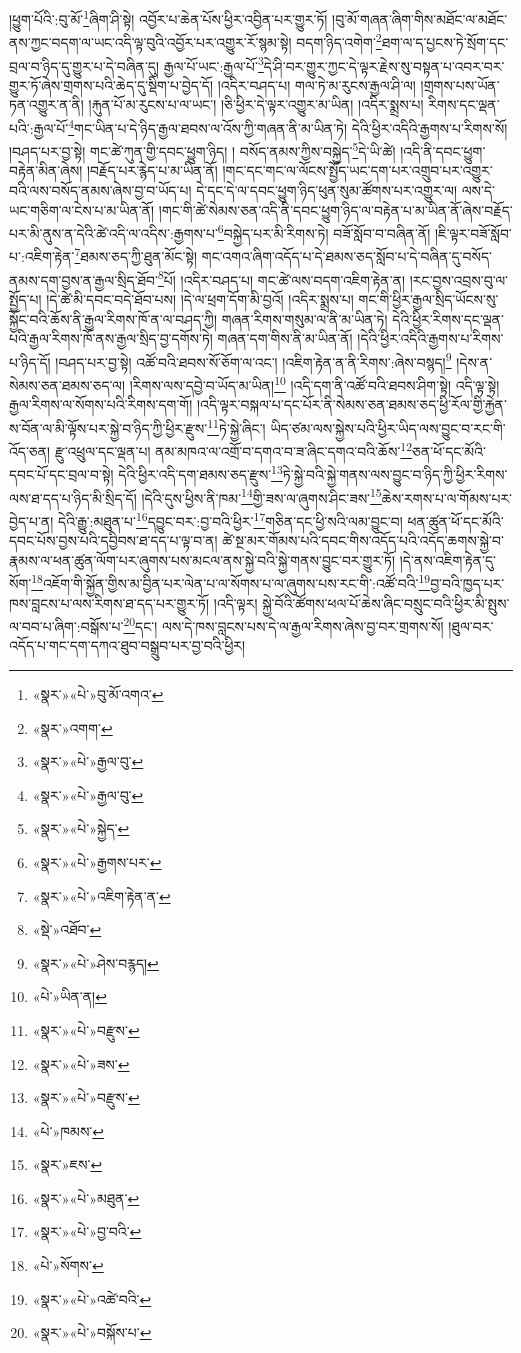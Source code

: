 །ཕྱུག་པོའི་:བུ་མོ་\footnote{«སྣར་»«པེ་»བུ་མོ་འགའ་}ཞིག་ཤི་སྟེ། འབྱོར་པ་ཆེན་པོས་ཕྱིར་འབྱིན་པར་གྱུར་ཏོ། །བུ་མོ་གཞན་ཞིག་གིས་མཐོང་ལ་མཐོང་ནས་ཀྱང་བདག་ལ་ཡང་འདི་ལྟ་བུའི་འབྱོར་པར་འགྱུར་རོ་སྙམ་སྟེ། བདག་ཉིད་འགེག་\footnote{«སྣར་»འགག་}ཐག་ལ་ད་པྱངས་ཏེ་སྲོག་དང་བྲལ་བ་ཉིད་དུ་གྱུར་པ་དེ་བཞིན་དུ། རྒྱལ་པོ་ཡང་:རྒྱལ་པོ་\footnote{«སྣར་»«པེ་»རྒྱལ་བུ་}དེ་ཤི་བར་གྱུར་ཀྱང་དེ་ལྟར་རྗེས་སུ་བསྟན་པ་འབར་བར་གྱུར་ཏོ་ཞེས་གྲགས་པའི་ཆེད་དུ་སྡིག་པ་བྱེད་དོ། །འདིར་བཤད་པ། གལ་ཏེ་མ་རུངས་རྒྱལ་ཤི་ལ། །གྲགས་པས་ཡོན་ཏན་འགྱུར་ན་ནི། །རྐུན་པོ་མ་རུངས་པ་ལ་ཡང་། །ཅི་ཕྱིར་དེ་ལྟར་འགྱུར་མ་ཡིན། །འདིར་སྨྲས་པ། རིགས་དང་ལྡན་པའི་:རྒྱལ་པོ་\footnote{«སྣར་»«པེ་»རྒྱལ་བུ་}གང་ཡིན་པ་དེ་ཉིད་རྒྱལ་ཐབས་ལ་འོས་ཀྱི་གཞན་ནི་མ་ཡིན་ཏེ། དེའི་ཕྱིར་འདིའི་རྒྱགས་པ་རིགས་སོ། །བཤད་པར་བྱ་སྟེ། གང་ཚེ་ཀུན་གྱི་དབང་ཕྱུག་ཉིད། །
བསོད་ནམས་ཀྱིས་བསྐྱེད་\footnote{«སྣར་»«པེ་»སྐྱེད་}དེ་ཡི་ཚེ། །འདི་ནི་དབང་ཕྱུག་བརྟེན་མིན་ཞེས། །བརྗོད་པར་རྙེད་པ་མ་ཡིན་ནོ། །གང་དང་གང་ལ་ལོངས་སྤྱོད་ཡང་དག་པར་འགྲུབ་པར་འགྱུར་བའི་ལས་བསོད་ནམས་ཞེས་བྱ་བ་ཡོད་པ། དེ་དང་དེ་ལ་དབང་ཕྱུག་ཉིད་ཕུན་སུམ་ཚོགས་པར་འགྱུར་ལ། ལས་དེ་ཡང་གཅིག་ལ་ངེས་པ་མ་ཡིན་ནོ། །གང་གི་ཚེ་སེམས་ཅན་འདི་ནི་དབང་ཕྱུག་ཉིད་ལ་བརྟེན་པ་མ་ཡིན་ནོ་ཞེས་བརྗོད་པར་མི་ནུས་ན་དེའི་ཚེ་འདི་ལ་འདིས་:རྒྱགས་པ་\footnote{«སྣར་»«པེ་»རྒྱགས་པར་}བསྐྱེད་པར་མི་རིགས་ཏེ། བཟོ་སློབ་བ་བཞིན་ནོ། །ཇི་ལྟར་བཟོ་སློབ་པ་:འཇིག་རྟེན་\footnote{«སྣར་»«པེ་»འཇིག་རྟེན་ན་}ཐམས་ཅད་ཀྱི་ཐུན་མོང་སྟེ། གང་འགའ་ཞིག་འདོད་པ་དེ་ཐམས་ཅད་སློབ་པ་དེ་བཞིན་དུ་བསོད་ནམས་དག་བྱས་ན་རྒྱལ་སྲིད་ཐོབ་\footnote{«སྡེ་»འཐོབ་}པོ། །འདིར་བཤད་པ། གང་ཚེ་ལས་བདག་འཇིག་རྟེན་ན། །རང་བྱས་འབྲས་བུ་ལ་སྤྱོད་པ། །དེ་ཚེ་མི་དབང་བདེ་ཐོབ་པས། །དེ་ལ་ཕྲག་དོག་མི་བྱའོ། །འདིར་སྨྲས་པ། གང་གི་ཕྱིར་རྒྱལ་སྲིད་ཡོངས་སུ་སྐྱོང་བའི་ཆོས་ནི་རྒྱལ་རིགས་ཁོ་ན་ལ་བཤད་ཀྱི། གཞན་རིགས་གསུམ་ལ་ནི་མ་ཡིན་ཏེ། དེའི་ཕྱིར་རིགས་དང་ལྡན་པའི་རྒྱལ་རིགས་ཁོ་ནས་རྒྱལ་སྲིད་བྱ་དགོས་ཏེ། གཞན་དག་གིས་ནི་མ་ཡིན་ནོ། །དེའི་ཕྱིར་འདིའི་རྒྱགས་པ་རིགས་པ་ཉིད་དོ། །བཤད་པར་བྱ་སྟེ། འཚོ་བའི་ཐབས་སོ་ཅོག་ལ་འང་། །འཇིག་རྟེན་ན་ནི་རིགས་:ཞེས་བསྙད།\footnote{«སྣར་»«པེ་»ཤེས་བརྙད།} །དེས་ན་སེམས་ཅན་ཐམས་ཅད་ལ། །རིགས་ལས་དབྱེ་བ་ཡོད་མ་ཡིན།\footnote{«པེ་»ཡིན་ན།} །འདི་དག་ནི་འཚོ་བའི་ཐབས་ཤིག་སྟེ། འདི་ལྟ་སྟེ། རྒྱལ་རིགས་ལ་སོགས་པའི་རིགས་དག་གོ། །འདི་ལྟར་བསྐལ་པ་དང་པོར་ནི་སེམས་ཅན་ཐམས་ཅད་ཕྱི་རོལ་གྱི་རྐྱེན་ས་བོན་ལ་མི་ལྟོས་པར་སྐྱེ་བ་ཉིད་ཀྱི་ཕྱིར་རྫུས་\footnote{«སྣར་»«པེ་»བརྫུས་}ཏེ་སྐྱེ་ཞིང་། ཡིད་ཙམ་ལས་སྐྱེས་པའི་ཕྱིར་ཡིད་ལས་བྱུང་བ་རང་གི་འོད་ཅན། རྫུ་འཕྲུལ་དང་ལྡན་པ། ནམ་མཁའ་ལ་འགྲོ་བ་དགའ་བ་ཟ་ཞིང་དགའ་བའི་ཆོས་\footnote{«སྣར་»«པེ་»ཟས་}ཅན་ཕོ་དང་མོའི་དབང་པོ་དང་བྲལ་བ་སྟེ། དེའི་ཕྱིར་འདི་དག་ཐམས་ཅད་རྫུས་\footnote{«སྣར་»«པེ་»བརྫུས་}ཏེ་སྐྱེ་བའི་སྐྱེ་གནས་ལས་བྱུང་བ་ཉིད་ཀྱི་ཕྱིར་རིགས་ལས་ཐ་དད་པ་ཉིད་མི་སྲིད་དོ། །དེའི་དུས་ཕྱིས་ནི་ཁམ་\footnote{«པེ་»ཁམས་}གྱི་ཟས་ལ་ཞུགས་ཤིང་ཟས་\footnote{«སྣར་»ཇས་}ཆེས་རགས་པ་ལ་གོམས་པར་བྱེད་པ་ན། དེའི་རྒྱུ་:མཐུན་པ་\footnote{«སྣར་»«པེ་»མཐུན་}དབྱུང་བར་:བྱ་བའི་ཕྱིར་\footnote{«སྣར་»«པེ་»བྱ་བའི་}གཅིན་དང་ཕྱི་སའི་ལམ་བྱུང་བ། ཕན་ཚུན་ཕོ་དང་མོའི་དབང་པོས་བྱས་པའི་དབྱིབས་ཐ་དད་པ་ལྟ་བ་ན། ཚེ་སྔ་མར་གོམས་པའི་དབང་གིས་འདོད་པའི་འདོད་ཆགས་སྐྱེ་བ་རྣམས་ལ་ཕན་ཚུན་ལོག་པར་ཞུགས་པས་མངལ་ནས་སྐྱེ་བའི་སྐྱེ་གནས་བྱུང་བར་གྱུར་ཏོ། །དེ་ནས་འཇིག་རྟེན་དུ་སོག་\footnote{«པེ་»སོགས་}འཇོག་གི་སྐྱོན་གྱིས་མ་བྱིན་པར་ལེན་པ་ལ་སོགས་པ་ལ་ཞུགས་པས་རང་གི་:འཚོ་བའི་\footnote{«སྣར་»«པེ་»འཚེ་བའི་}བྱ་བའི་ཁྱད་པར་ཁས་བླངས་པ་ལས་རིགས་ཐ་དད་པར་གྱུར་ཏོ། །འདི་ལྟར། སྐྱེ་བོའི་ཚོགས་ཕལ་པོ་ཆེས་ཞིང་བསྲུང་བའི་ཕྱིར་མི་སྤུས་ལ་བབ་པ་ཞིག་:བསྒོས་པ་\footnote{«སྣར་»«པེ་»བསྐོས་པ་}དང་། ལས་དེ་ཁས་བླངས་པས་དེ་ལ་རྒྱལ་རིགས་ཞེས་བྱ་བར་གྲགས་སོ། །ཐུལ་བར་འདོད་པ་གང་དག་དཀའ་ཐུབ་བསྒྲུབ་པར་བྱ་བའི་ཕྱིར། 
